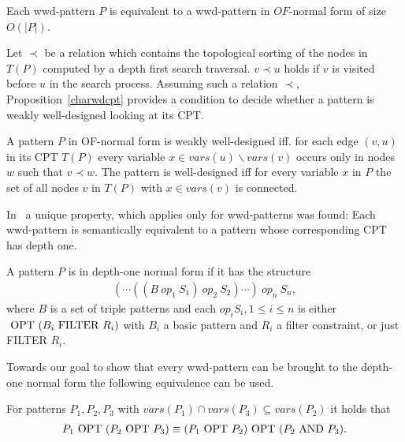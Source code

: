 \begin{proposition}\label{wwdtoofnf}
	Each wwd-pattern $P$ is equivalent to a wwd-pattern in $OF$-normal form of
	size $O(|P|)$.
\end{proposition}

Let $\prec$ be a relation which contains the topological sorting of the nodes in
$T(P)$ computed by a depth first search traversal. $v \prec u$ holds if $v$ is visited before
$u$ in the search process. Assuming such a relation $\prec$, Proposition~\ref{charwdcpt} 
provides a condition to decide whether a pattern is weakly well-designed looking
at its CPT.

\begin{proposition}\label{charwdcpt}
	A pattern $P$ in OF-normal form is weakly well-designed iff. for each edge
	$(v,u)$ in its CPT $T(P)$ every variable $x \in vars(u) \backslash vars(v)$
	occurs only in nodes $w$ such that $v \prec w$. The pattern is well-designed
	iff for every variable $x$ in $P$ the set of all nodes $v$ in $T(P)$ with
	$x \in vars(v)$ is connected.
\end{proposition}

In~\cite{kaminski_bwd} a unique property, which applies only for
wwd-patterns was found: Each wwd-pattern is semantically equivalent to a pattern whose corresponding
CPT has depth one.
\begin{definition}
	A pattern $P$ is in depth-one normal form if it has the structure
	\begin{align*}
		(\cdots((B \ op_1 \ S_1) \ op_2 \ S_2) \cdots)\ op_n \ S_n,
	\end{align*}
	where $B$ is a set of triple patterns and each $op_i S_i, 1 \leq i \leq n$ is either
	$\mbox{ OPT } (B_i \mbox{ FILTER } R_i)$ with $B_i$ a basic pattern and $R_i$ a filter
	constraint, or just FILTER $R_i$.
\end{definition}

Towards our goal to show that every wwd-pattern can be brought to the depth-one
normal form the following equivalence can be used.
\begin{proposition}\label{equivdep1}
	For patterns $P_1, P_2,P_3$ with $vars(P_1) \cap vars(P_3) \subseteq
	vars(P_2)$ it holds that 
	\begin{align*}
		P_1 \mbox{ OPT } (P_2 \mbox{ OPT } P_3) \equiv (P_1 \mbox{ OPT } P_2) \mbox{ OPT } (P_2 \mbox{ AND } P_3).
	\end{align*}
\end{proposition}

